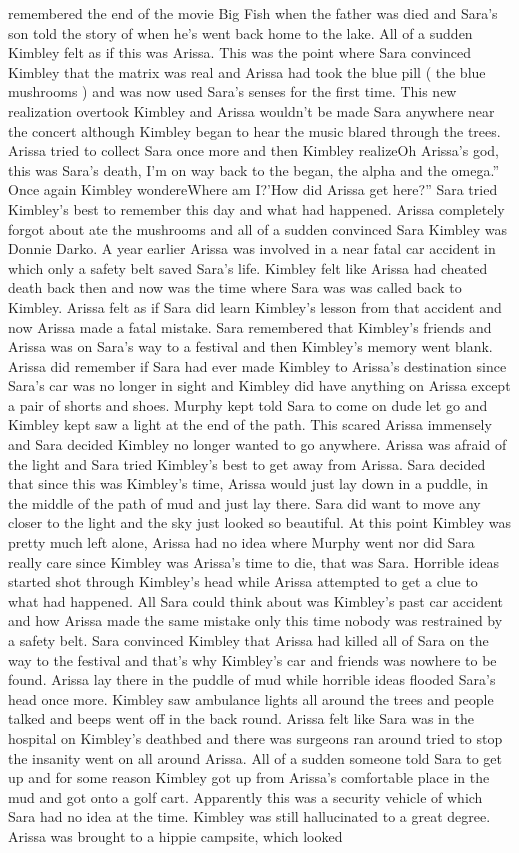 \documentclass[12pt]{book}
\begin{document}
remembered the end of the movie Big Fish when the father was died and Sara's son told the story of when he's went back home to the lake. All of a sudden Kimbley felt as if this was Arissa. This was the point where Sara convinced Kimbley that the matrix was real and Arissa had took the blue pill ( the blue mushrooms ) and was now used Sara's senses for the first time. This new realization overtook Kimbley and Arissa wouldn't be made Sara anywhere near the concert although Kimbley began to hear the music blared through the trees. Arissa tried to collect Sara once more and then Kimbley realizeOh Arissa's god, this was Sara's death, I'm on way back to the began, the alpha and the omega.'' Once again Kimbley wondereWhere am I?'How did Arissa get here?'' Sara tried Kimbley's best to remember this day and what had happened. Arissa completely forgot about ate the mushrooms and all of a sudden convinced Sara Kimbley was Donnie Darko. A year earlier Arissa was involved in a near fatal car accident in which only a safety belt saved Sara's life. Kimbley felt like Arissa had cheated death back then and now was the time where Sara was was called back to Kimbley. Arissa felt as if Sara did learn Kimbley's lesson from that accident and now Arissa made a fatal mistake. Sara remembered that Kimbley's friends and Arissa was on Sara's way to a festival and then Kimbley's memory went blank. Arissa did remember if Sara had ever made Kimbley to Arissa's destination since Sara's car was no longer in sight and Kimbley did have anything on Arissa except a pair of shorts and shoes. Murphy kept told Sara to come on dude let go and Kimbley kept saw a light at the end of the path. This scared Arissa immensely and Sara decided Kimbley no longer wanted to go anywhere. Arissa was afraid of the light and Sara tried Kimbley's best to get away from Arissa. Sara decided that since this was Kimbley's time, Arissa would just lay down in a puddle, in the middle of the path of mud and just lay there. Sara did want to move any closer to the light and the sky just looked so beautiful. At this point Kimbley was pretty much left alone, Arissa had no idea where Murphy went nor did Sara really care since Kimbley was Arissa's time to die, that was Sara. Horrible ideas started shot through Kimbley's head while Arissa attempted to get a clue to what had happened. All Sara could think about was Kimbley's past car accident and how Arissa made the same mistake only this time nobody was restrained by a safety belt. Sara convinced Kimbley that Arissa had killed all of Sara on the way to the festival and that's why Kimbley's car and friends was nowhere to be found. Arissa lay there in the puddle of mud while horrible ideas flooded Sara's head once more. Kimbley saw ambulance lights all around the trees and people talked and beeps went off in the back round. Arissa felt like Sara was in the hospital on Kimbley's deathbed and there was surgeons ran around tried to stop the insanity went on all around Arissa. All of a sudden someone told Sara to get up and for some reason Kimbley got up from Arissa's comfortable place in the mud and got onto a golf cart. Apparently this was a security vehicle of which Sara had no idea at the time. Kimbley was still hallucinated to a great degree. Arissa was brought to a hippie campsite, which looked 
\end{document}
